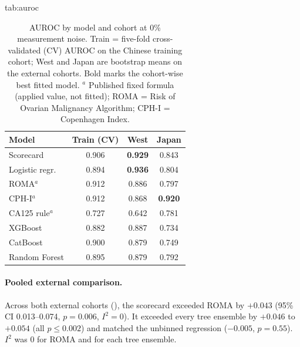\documentclass[pmlr,twocolumn,10pt]{jmlr} %
\begin{document}
\begin{table}[htbp]
\floatconts
  {tab:auroc}
  {\caption{AUROC by model and cohort at 0\% measurement noise. Train =
   five-fold cross-validated (CV) AUROC on the Chinese training cohort;
   West and Japan are bootstrap means on the external cohorts. Bold marks
   the cohort-wise best fitted model. $^{a}$ Published fixed formula
   (applied value, not fitted); ROMA = Risk of Ovarian Malignancy
   Algorithm; CPH-I = Copenhagen Index.}}
  {\setlength{\tabcolsep}{4pt}\begin{tabular}{lccc}
  \toprule
  Model & Train (CV) & West & Japan\\
  \midrule
  Scorecard & 0.906 & \textbf{0.929} & 0.843\\
  Logistic regr. & 0.894 & \textbf{0.936} & 0.804\\
  ROMA$^{a}$ & 0.912 & 0.886 & 0.797\\
  CPH-I$^{a}$ & 0.912 & 0.868 & \textbf{0.920}\\
  CA125 rule$^{a}$ & 0.727 & 0.642 & 0.781\\
  XGBoost & 0.882 & 0.887 & 0.734\\
  CatBoost & 0.900 & 0.879 & 0.749\\
  Random Forest & 0.895 & 0.879 & 0.792\\
  \bottomrule
  \end{tabular}}
\end{table}

\paragraph{Pooled external comparison.} Across both external cohorts
(), the scorecard exceeded ROMA by $+0.043$ (95\% CI
0.013--0.074, $p=0.006$, $I^2=0$). It exceeded every tree ensemble by
$+0.046$ to $+0.054$ (all $p\le0.002$) and matched the unbinned regression
($-0.005$, $p=0.55$). $I^2$ was 0 for ROMA and for each tree ensemble.
\end{document}
